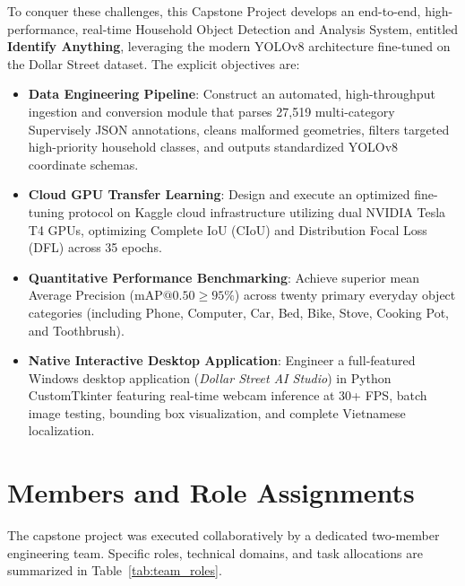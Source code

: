 To conquer these challenges, this Capstone Project develops an end-to-end, high-performance, real-time Household Object Detection and Analysis System, entitled \textbf{Identify Anything}, leveraging the modern YOLOv8 architecture fine-tuned on the Dollar Street dataset. The explicit objectives are:
\begin{itemize}
    \item \textbf{Data Engineering Pipeline}: Construct an automated, high-throughput ingestion and conversion module that parses 27,519 multi-category Supervisely JSON annotations, cleans malformed geometries, filters targeted high-priority household classes, and outputs standardized YOLOv8 coordinate schemas.
    \item \textbf{Cloud GPU Transfer Learning}: Design and execute an optimized fine-tuning protocol on Kaggle cloud infrastructure utilizing dual NVIDIA Tesla T4 GPUs, optimizing Complete IoU (CIoU) and Distribution Focal Loss (DFL) across 35 epochs.
    \item \textbf{Quantitative Performance Benchmarking}: Achieve superior mean Average Precision ($\text{mAP}@0.50 \ge 95\%$) across twenty primary everyday object categories (including Phone, Computer, Car, Bed, Bike, Stove, Cooking Pot, and Toothbrush).
    \item \textbf{Native Interactive Desktop Application}: Engineer a full-featured Windows desktop application (\textit{Dollar Street AI Studio}) in Python CustomTkinter featuring real-time webcam inference at 30+ FPS, batch image testing, bounding box visualization, and complete Vietnamese localization.
\end{itemize}

\section{Members and Role Assignments}
\label{sec:members_roles}

The capstone project was executed collaboratively by a dedicated two-member engineering team. Specific roles, technical domains, and task allocations are summarized in Table~\ref{tab:team_roles}.

